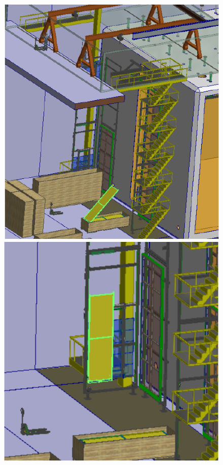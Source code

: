 \begin{figure}[!htb]
\begin{center}
\begin{minipage}[c]{0.32\textwidth}
\includegraphics[width=\textwidth]{far-detector-single-phase/figures/CPA-1.pdf}
\end{minipage}
\begin{minipage}[c]{0.32\textwidth}
\includegraphics[width=\textwidth]{far-detector-single-phase/figures/CPA-2.pdf}

\end{minipage}
\end{center}
\end{figure}
